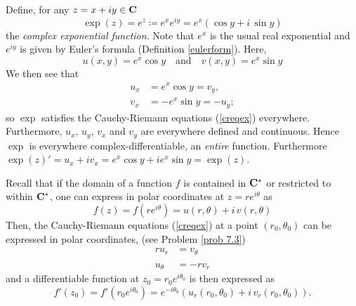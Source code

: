 \vspace*{1em}

\begin{example}\label{expcmplxeg}
Define, for any $z = x + iy \in \mathbf C$
\[\exp(z) = e^z \coloneqq e^xe^{iy} = e^x(\cos y + i\,\sin y)\]
the \emph{complex exponential function}. Note that $e^x$ is the usual real exponential and $e^{iy}$ is given by Euler's formula (Definition \ref{eulerform}). Here, 
\[u(x,y) = e^x\cos y \quad \text{and} \quad v(x,y) = e^x\sin y\]
We then see that
\begin{align*}
u_x &= e^x\cos y = v_y,\\[0.5em] v_x &= -e^x\sin y = -u_y;
\end{align*}
so $\exp$ satisfies the Cauchy-Riemann equations (\ref{creqex}) everywhere. Furthermore, $u_x,\,u_y,\,v_x$ and $v_y$ are everywhere defined and continuous. Hence $\exp$ is everywhere complex-differentiable, an \emph{entire} function. Furthermore $\exp(z)' = u_x + iv_x = e^x\cos y + ie^x\sin y = \exp(z)$.
\end{example}

\vspace*{1em}

\begin{discussion}
Recall that if the domain of a function $f$ is contained in $\mathbf C^*$ or restricted to within $\mathbf C^*$, one can express in polar coordinates at $z = re^{i\theta}$ as
\[f(z) = f(re^{i\theta}) = u(r,\theta) + i\,v(r,\theta)\]
Then, the Cauchy-Riemann equations (\ref{creqex}) at a point $(r_0,\theta_0)$ can be expressed in polar coordinates,  (see Problem \ref{prob 7.3})
\begin{align*}\label{pcreqex}
ru_r &= v_\theta\\[-0.5em]
\tag{Polar CR}\\[-0.5em]
u_\theta &= -rv_r
\end{align*}
and a differentiable function at $z_0 = r_0e^{i\theta_0}$ is then expressed as \[f'(z_0) = f'(r_0e^{i\theta_0}) = e^{-i\theta_0}(u_r(r_0,\theta_0) + i\,v_r(r_0,\theta_0)).\]
\end{discussion}

\vspace*{1em}

